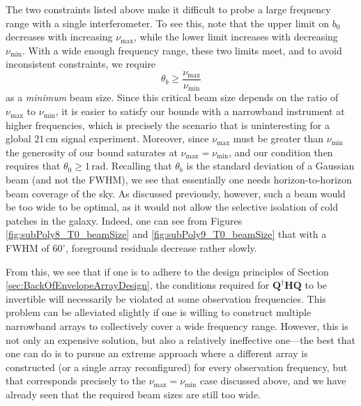 \documentclass[twocolumn,apj,numberedappendix]{emulateapj}
\newcommand{\Hmat}{\mathbf{H}}
\newcommand{\Q}{\mathbf{Q}}
\newcommand{\acl}[1]{}
\newcommand{\mep}[1]{}
\begin{document}

The two constraints listed above make it difficult to probe a large frequency range with a single interferometer.  To see this, note that the upper limit on $b_0$ decreases with increasing $\nu_\textrm{max}$, while the lower limit increases with decreasing $\nu_\textrm{min}$.  With a wide enough frequency range, these two limits meet, and to avoid inconsistent constraints, we require
\begin{equation}
\theta_b \ge \frac{\nu_\textrm{max} }{\nu_\textrm{min}}
\end{equation}
as a \emph{minimum} beam size.  Since this critical beam size depends on the ratio of $\nu_\textrm{max}$ to $\nu_\textrm{min}$, it is easier to satisfy our bounds with a narrowband instrument at higher frequencies, which is precisely the scenario that is uninteresting for a global $21\,\textrm{cm}$ signal experiment. Moreover, since $\nu_\textrm{max}$ must be greater than $\nu_\textrm{min}$ the generosity of our bound saturates at $\nu_\textrm{max} = \nu_\textrm{min}$, and our condition then requires that $\theta_0 \ge 1\,\textrm{rad}$. Recalling that $\theta_b$ is the standard deviation of a Gaussian beam (and not the FWHM), we see that essentially one needs horizon-to-horizon beam coverage of the sky. As discussed previously, however, such a beam would be too wide to be optimal, as it would not allow the selective isolation of cold patches in the galaxy. Indeed, one can see from Figures \ref{fig:subPoly8_T0_beamSize} and \ref{fig:subPoly9_T0_beamSize} that with a FWHM of $60^\circ$, foreground residuals decrease rather slowly.
%

From this, we see that if one is to adhere to the design principles of Section \ref{sec:BackOfEnvelopeArrayDesign}, the conditions required for $\Q^\dagger \Hmat \Q$ to be invertible will necessarily be violated at some observation frequencies. This problem can be alleviated slightly if one is willing to construct multiple narrowband arrays to collectively cover a wide frequency range. However, this is not only an expensive solution, but also a relatively ineffective one---the best that one can do is to pursue an extreme approach where a different array is constructed (or a single array reconfigured) for every observation frequency, but that corresponds precisely to the $\nu_\textrm{max} = \nu_\textrm{min}$ case discussed above, and we have already seen that the required beam sizes are still too wide.
\end{document}
